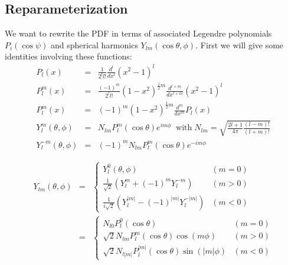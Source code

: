 \documentclass[a4paper,9pt,twosided]{article}
\begin{document}
\subsection{Reparameterization}
We want to rewrite the PDF in terms of associated Legendre polynomials $P_{i}(\cos\psi)$ and spherical harmonics $Y_{lm}(\cos\theta,\phi)$. First we will give some identities involving these functions:
\begin{eqnarray}
P_l(x) &=& \frac{1}{2^l l!} \frac{d^l}{dx^l}(x^2-1)^l \\
P_l^m(x) &=& \frac{(-1)^m}{2^l l!} (1-x^2)^{\frac{1}{2}m} \frac{d^{l+m}}{dx^{l+m}} (x^2-1)^l\\
P_l^m(x) &=& (-1)^m (1-x^2)^{\frac{1}{2}m} \frac{d^{m}}{dx^{m}} P_l(x)\\
Y_l^m (\theta,\phi) &=& N_{lm} P_l^m(\cos\theta)e^{im\phi}\;\;\mathrm{with}\;N_{lm} =\sqrt{ \frac{2l+1}{4\pi}\frac{(l-m)!}{(l+m)!} } \\
Y_l^{-m}(\theta,\phi) &=& (-1)^m N_{lm}P_l^m(\cos\theta) e^{-im\phi}
\end{eqnarray}

\begin{eqnarray}
Y_{lm}(\theta,\phi) & = & \left\{ \begin{array}{cl} 
                                             Y_l^0(\theta,\phi) & (m=0) \\
                                             \frac{1}{\sqrt{2}} \left( Y_l^m + (-1)^m Y_l^{-m}\right)  & (m>0) \\
                                             \frac{1}{i\sqrt{2}}\left( Y_l^{|m|}-(-1)^{|m|}Y_l^{-|m|} \right) & (m<0)
                                  \end{array}\right.\\
                    & = & \left\{ \begin{array}{cl} 
                                             N_{l0} P_l^0(\cos\theta) & (m=0) \\
                                             \sqrt{2}N_{lm}P_l^m(\cos\theta)\cos(m\phi) & (m>0) \\
                                             \sqrt{2}N_{l|m|} P_l^{|m|}(\cos\theta)\sin(|m|\phi)& (m<0)
                                  \end{array}\right.
\end{eqnarray}
\end{document}

